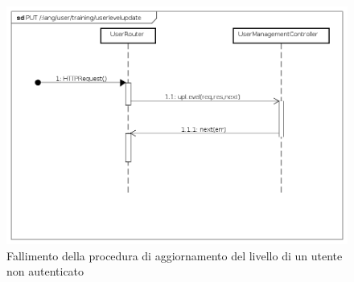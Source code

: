 \begin{itemize}
\begin{figure}[ht]
	\centering
	\includegraphics[scale=0.45]{UML/DiagrammiDiSequenza/Back-end/PUT__lang_user_training_userlevelupdate_failure.png}
	\caption{Fallimento della procedura di aggiornamento del livello di un utente non autenticato}
\end{figure}
\FloatBarrier

\end{itemize} 